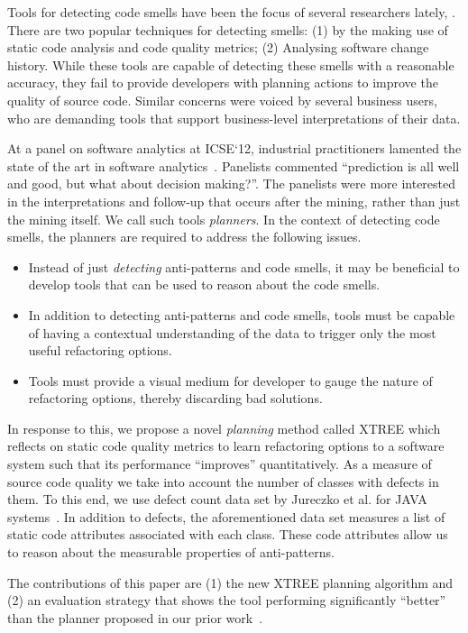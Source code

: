 \documentclass{sig-alternate}
\newcommand{\bi}{\begin{itemize}}
\newcommand{\ei}{\end{itemize}}
\begin{document}
Tools for detecting code smells have been the focus of several researchers lately, \cite{Tufano2015}\cite{boussaa13}. There are two  popular techniques for detecting smells: (1) by the making use of static code analysis and code quality metrics\cite{tsantalis09}; (2) Analysing software change history\cite{moha2010}. While these tools are capable of detecting these smells with a reasonable accuracy, they fail to provide developers with planning actions to improve the quality of source code.  Similar concerns were voiced by several business users, who are demanding tools that support business-level interpretations of their data. 

At a panel on software analytics at ICSE`12, industrial practitioners lamented the state of the art in software analytics~\cite{menzies12a}. Panelists commented  ``prediction is all well and good, but what about decision making?''. The panelists were more interested in the interpretations and follow-up that occurs after the mining, rather than just the mining itself. We call such tools \textit{planners}. In the context of detecting code smells, the planners are required to address the following issues.

\bi
\item
Instead of just \textit{detecting} anti-patterns and code smells, it may be beneficial to develop tools that can be used to reason about the code smells. 
\item
In addition to detecting anti-patterns and code smells, tools must be capable of having a contextual understanding of the data to trigger only the most useful refactoring options.
\item Tools must provide a visual medium for developer to gauge the nature of refactoring options, thereby discarding bad solutions.
\ei

In response to this, we propose a novel {\em planning} method called XTREE which reflects on static code quality metrics to learn refactoring options to a software system such that its performance ``improves'' quantitatively. As a measure of source code quality we take into account the number of classes with defects in them. To this end, we use defect count data set by Jureczko et al. for JAVA systems~\cite{jureczko10}. In addition to defects, the aforementioned data set measures a list of static code attributes associated with each class. These code attributes allow us to reason about the measurable properties of anti-patterns. 

The contributions of this paper are (1) the new XTREE planning algorithm and (2) an evaluation strategy that shows the tool performing significantly ``better'' than  the  planner  proposed in our prior work~\cite{me12c}. 
\end{document}
